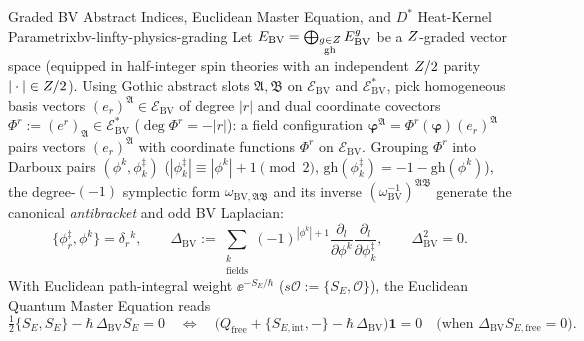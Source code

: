 \begin{zkmodule}{Graded BV Abstract Indices, Euclidean Master Equation, and $D^*$ Heat-Kernel Parametrix}{bv-linfty-physics-grading}
Let $E_{\mathrm{BV}} = \bigoplus_{\substack{g\in Z\\\mathrm{gh}}}E_{\mathrm{BV}}^g$ be a $Z$-graded vector space (equipped in half-integer spin theories with an independent $Z/2$ parity $|\cdot| \in Z/2$). Using Gothic abstract slots $\mathfrak{A},\mathfrak{B}$ on $\mathcal{E}_{\mathrm{BV}}$ and $\mathcal{E}_{\mathrm{BV}}^*$, pick homogeneous basis vectors $(e_r)^{\mathfrak{A}} \in \mathcal{E}_{\mathrm{BV}}$ of degree $|r|$ and dual coordinate covectors $\Phi^r := (e^r)_{\mathfrak{A}} \in \mathcal{E}_{\mathrm{BV}}^*$ ($\deg\Phi^r = -|r|$): a field configuration $\boldsymbol{\varphi}^{\mathfrak{A}} = \Phi^r(\boldsymbol{\varphi})(e_r)^{\mathfrak{A}}$ pairs vectors $(e_r)^{\mathfrak{A}}$ with coordinate functions $\Phi^r$ on $\mathcal{E}_{\mathrm{BV}}$. Grouping $\Phi^r$ into Darboux pairs $(\phi^k, \phi^\ddagger_k)$ ($|\phi^\ddagger_k| \equiv |\phi^k| + 1 \pmod 2$, $\mathrm{gh}(\phi^\ddagger_k) = -1 - \mathrm{gh}(\phi^k)$), the degree-$(-1)$ symplectic form $\omega_{\mathrm{BV},\mathfrak{A}\mathfrak{B}}$ and its inverse $(\omega_{\mathrm{BV}}^{-1})^{\mathfrak{A}\mathfrak{B}}$ generate the canonical \emph{antibracket} and odd BV Laplacian:
\begin{equation}
\label{eq:bv-locked-conventions}
\{\phi^\ddagger_r, \phi^k\} = \delta_r{}^k,\qquad
\Delta_{\mathrm{BV}} := \sum_{\substack{k\\\mathrm{fields}}}(-1)^{|\phi^k|+1}\frac{\partial_l}{\partial\phi^k}\frac{\partial_l}{\partial\phi^\ddagger_k},\qquad
\Delta_{\mathrm{BV}}^2 = 0.
\end{equation}
With Euclidean path-integral weight $\ee^{-S_E/\hbar}$ ($s\mathcal{O} := \{S_E,\mathcal{O}\}$), the Euclidean Quantum Master Equation reads
\begin{equation}
\label{eq:qme-locked-euclidean}
\tfrac{1}{2}\{S_E, S_E\} - \hbar\,\Delta_{\mathrm{BV}}S_E = 0
\quad\Longleftrightarrow\quad
\bigl(Q_{\mathrm{free}} + \{S_{E,\mathrm{int}}, -\} - \hbar\,\Delta_{\mathrm{BV}}\bigr)\mathbf{1} = 0\quad \bigl(\text{when }\Delta_{\mathrm{BV}}S_{E,\mathrm{free}} = 0\bigr).
\end{equation}


\end{zkmodule}
